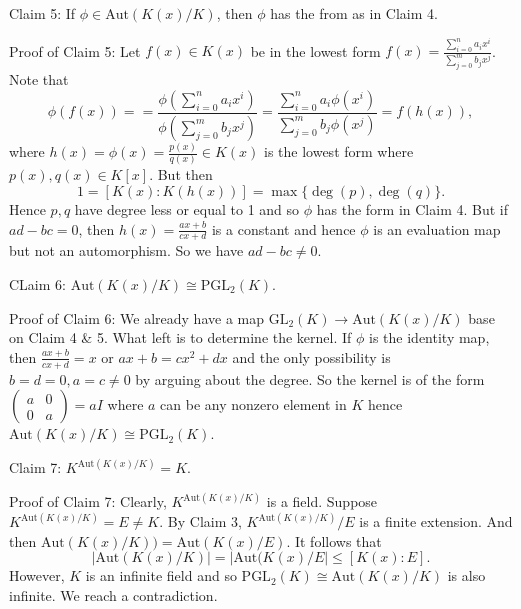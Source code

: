 \documentclass[12pt,a4paper]{article}
\def\Aut{\text{Aut}}
\begin{document}
\bigskip
Claim 5: If $\phi\in \Aut(K(x)/K)$, then $\phi$ has the from as in Claim 4. 


Proof of Claim 5: Let $f(x)\in K(x)$ be in the lowest form $f(x)=\frac{\sum_{i=0}^n a_ix^i}{\sum_{j=0}^m b_j x^j}$. Note that 
$$\phi(f(x))==\frac{\phi(\sum_{i=0}^n a_ix^i)}{\phi(\sum_{j=0}^m b_j x^j)}=\frac{\sum_{i=0}^n a_i\phi(x^i)}{\sum_{j=0}^m b_j \phi(x^j)}=f(h(x)),$$ where $h(x)=\phi(x)=\frac{p(x)}{q(x)}\in K(x)$ is the lowest form where $p(x),q(x)\in K[x]$. But then $$1=[K(x):K(h(x))]= \max\{\deg(p),\deg(q)\}.$$ Hence $p,q$ have degree less or equal to 1 and so $\phi$ has the form in Claim 4. But if $ad-bc=0$, then $h(x)=\frac{ax+b}{cx+d}$ is a constant and hence $\phi$ is an evaluation map but not an automorphism. So we have $ad-bc\not=0$.


\bigskip
CLaim 6: $\Aut(K(x)/K)\cong \mbox{PGL}_2(K)$.


Proof of Claim 6: We already have a map $\mbox{GL}_2(K)\to \Aut(K(x)/K)$ base on Claim  4 \& 5. What left is to determine the kernel. If $\phi$ is the identity map, then $\frac{ax+b}{cx+d}= x$ or $ax+b=cx^2+dx$ and the only possibility is $b=d=0, a=c\not=0$ by arguing about the degree. So the kernel is of the form $\begin{pmatrix}
    a & 0\\
    0 & a
\end{pmatrix}=aI$ where $a$ can be any nonzero element in $K$ hence $\Aut(K(x)/K)\cong \mbox{PGL}_2(K)$. 

\bigskip

Claim 7: $K^{\Aut(K(x)/K)}=K$.

Proof of Claim 7: Clearly, $K^{\Aut(K(x)/K)}$ is a field. Suppose $K^{\Aut(K(x)/K)}=E\not= K$. By Claim 3, $K^{\Aut(K(x)/K)}/E$ is a finite extension. And then  $\Aut(K(x)/K))=\Aut(K(x)/E)$. It follows that  $$|\Aut(K(x)/K)|=|\Aut(K(x)/E|\leq [K(x):E].$$
However, $K$ is an infinite field and so $\mbox{PGL}_2(K)\cong \Aut(K(x)/K)$ is also infinite. We reach a contradiction.
\end{document}

